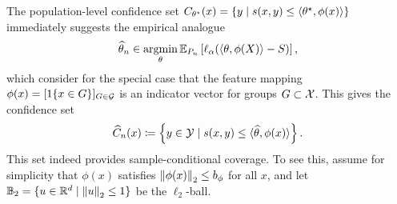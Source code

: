 \documentclass{article}
\newcommand{\radphi}{b_{\phi}}
\newcommand{\loss}{\ell}
\newcommand{\scorefunc}{s}
\newcommand{\scoreval}{\scorefunc}
\newcommand{\scorerv}{S}
\begin{document}
The population-level confidence set $C_{\theta\opt}(x) = \{y \mid
\scoreval(x, y) \le \<\theta\opt, \phi(x)\>\}$ immediately
suggests the empirical analogue
\begin{equation}
  \what{\theta}_n \in
  \argmin_\theta
  \E_{P_n}\left[\loss_\alpha(\<\theta, \phi(X)\> - \scorerv)\right],
  \label{eqn:empirical-quantile-estimator}
\end{equation}
which \citet{JungNoRaRo23} consider for the special
case that the feature mapping $\phi(x) = [1\!\left\{x \in G\right\}]_{G \in \mathcal{G}}$ is an
indicator vector for groups $G \subset \mathcal{X}$.
%
This gives
the confidence set
\begin{equation*}
  \what{C}_n(x) \defeq \left\{y \in \mc{Y}
  \mid \scoreval(x, y) \le \<\what{\theta}, \phi(x)\> \right\}.
\end{equation*}
%
This set indeed provides sample-conditional
coverage.
%
To see this, assume for simplicity that $\phi(x)$
satisfies $\ltwo{\phi(x)} \le \radphi$ for all $x$,
and let $\mathbb{B}_2 = \{u \in \mathbb{R}^d \mid \left\|{u}\right\|_2 \le 1\}$ be the
$\ell_2$-ball.
\end{document}
